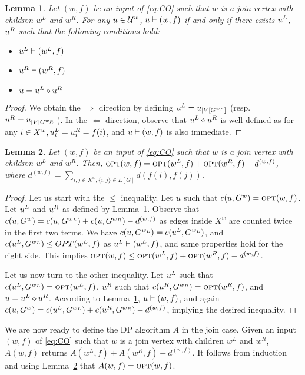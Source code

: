\documentclass[12pt]{article}
\newtheorem{lemma}{Lemma}
\newcommand{\blue}[1]{{\color{black}#1}}
\begin{document}
\begin{appendix}
\begin{lemma}\label{lemma:join1}
  Let $(w,f)$ be an input of \ref{eq:CO} such that $w$ is a join vertex with children $w^L$ and $w^R$.
  For any $u \in \mathcal{U}^w$, $u \vdash (w,f)$ if and only if there exists $u^L$, $u^R$ such that the following conditions hold:
  \begin{itemize}
  \item $u^L \vdash (w^L,f)$
  \item $u^R \vdash (w^R,f)$
  \item $u = u^L \diamond u^R$
  \end{itemize}
\end{lemma}
\begin{proof} 
\blue{We obtain the $\Rightarrow$ direction} by defining $u^L=u_{|V[G^{w_L}]}$ (resp. $u^R=u_{|V[G^{w_R}]}$).
In the $\Leftarrow$ direction, observe that $u^L \diamond u^R$ is well defined as for any $i \in X^w, u^L_i = u^R_i = f(i)$, and
$u \vdash (w,f)$ is also immediate.
\end{proof}


\begin{lemma}\label{lemma:join2}
   Let $(w,f)$ be an input of \ref{eq:CO} such that $w$ is a join vertex with children $w^L$ and $w^R$. Then, 
  $\mbox{\textsc{opt}}(w,f) = \mbox{\textsc{opt}}(w^L,f)+\mbox{\textsc{opt}}(w^R,f)-d^{(w,f)}$, where $d^{(w,f)} = \sum_{i,j \in X^w, \{i,j\} \in E[G]} d(f(i),f(j))$.
\end{lemma}
\begin{proof} 
  Let us start with the $\le$ inequality.
  Let $u$ such that $c(u,G^w)=\mbox{\textsc{opt}}(w,f)$. Let $u^L$ and $u^R$ as defined by Lemma~\ref{lemma:join1}.
  Observe that $c(u,G^w) = c(u,G^{w_L})+ c(u,G^{w_R})-d^{(w,f)}$ as edges inside $X^w$ are counted twice in the first two terms.
  We have $c(u,G^{w_L}) = c(u^L,G^{w_L})$, and $c(u^L,G^{w_L}) \le OPT(w^L,f)$ as $u^L \vdash (w^L,f)$, and same properties hold for the right side.
  This implies $\mbox{\textsc{opt}}(w,f) \le \mbox{\textsc{opt}}(w^L,f)+\mbox{\textsc{opt}}(w^R,f)-d^{(w,f)}$.

  Let us now turn to the other inequality.
  Let $u^L$ such that $c(u^L,G^{w_L})=\mbox{\textsc{opt}}(w^L,f)$, $u^R$ such that $c(u^R,G^{w_R})=\mbox{\textsc{opt}}(w^R,f)$, and $u = u^L \diamond u^R$.
  According to Lemma~\ref{lemma:join1}, $u \vdash (w,f)$, and again $c(u,G^w) = c(u^L,G^{w_L})+ c(u^R,G^{w_R})-d^{(w,f)}$, implying the desired inequality. 
\end{proof}


We are now ready to define the DP algorithm $A$ in the join case.
Given an input $(w,f)$ of \ref{eq:CO} such that $w$ is a join vertex with children $w^L$ and $w^R$, $A(w,f)$ returns $A(w^L,f)+A(w^R,f)-d^{(w,f)}$.
It \blue{follows} from induction and using Lemma~\ref{lemma:join2} that $A(w,f)=\mbox{\textsc{opt}}(w,f)$.


\end{appendix}
\end{document}
